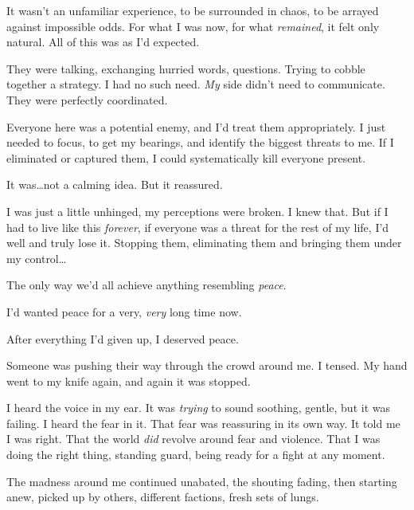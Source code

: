 It wasn't an unfamiliar experience, to be surrounded in chaos, to be arrayed against impossible odds.  For what I was now, for what \emph{remained}, it felt only natural.  All of this was as I'd expected.



They were talking, exchanging hurried words, questions.  Trying to cobble together a strategy.  I had no such need.  \emph{My} side didn't need to communicate.  They were perfectly coordinated.



Everyone here was a potential enemy, and I'd treat them appropriately.  I just needed to focus, to get my bearings, and identify the biggest threats to me.  If I eliminated or captured them, I could systematically kill everyone present.



It was\ldots not a calming idea.  But it reassured.



I was just a little unhinged, my perceptions were broken.  I knew that.  But if I had to live like this \emph{forever}, if everyone was a threat for the rest of my life, I'd well and truly lose it.  Stopping them, eliminating them and bringing them under my control\ldots



The only way we'd all achieve anything resembling \emph{peace}.



I'd wanted peace for a very, \emph{very} long time now.



After everything I'd given up, I deserved peace.



Someone was pushing their way through the crowd around me.  I tensed.  My hand went to my knife again, and again it was stopped.



I heard the voice in my ear.  It was \emph{trying } to sound soothing, gentle, but it was failing.  I heard the fear in it.  That fear was reassuring in its own way.  It told me I was right.  That the world \emph{did} revolve around fear and violence. That I was doing the right thing, standing guard, being ready for a fight at any moment.



The madness around me continued unabated, the shouting fading, then starting anew, picked up by others, different factions, fresh sets of lungs.



